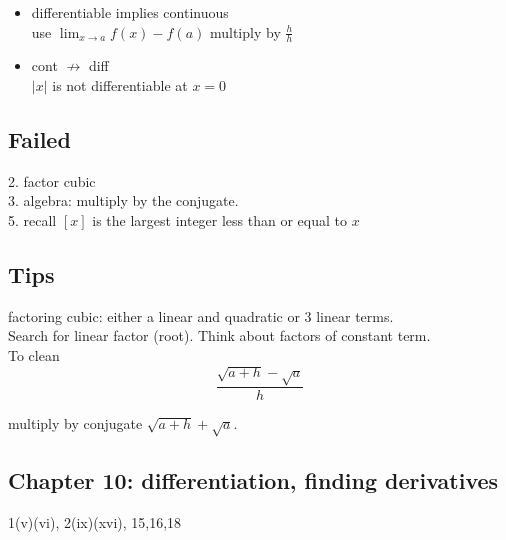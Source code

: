 \documentclass[a4paper, 12pt]{article}
\begin{document}

\begin{itemize}
    \item differentiable implies continuous\\
   \textcolor[gray]{0.5}{ use $\lim_{x\rightarrow a} f(x) - f(a)$ multiply by $\frac{h}{h}$}
    \item cont $\not \rightarrow$ diff\\ 
    $|x|$ is not differentiable at $x=0$
\end{itemize}

\subsection*{Failed}
2. factor cubic\\
3. algebra: multiply by the conjugate.\\
5. recall $[x]$ is the largest integer less than or equal to $x$
\subsection*{Tips}

factoring cubic: either a linear and quadratic or 3 linear terms. \\
Search for linear factor (root). Think about factors of constant term. \\

To clean $$\frac{\sqrt{a + h} - \sqrt{a}}{h}$$

multiply by conjugate $\sqrt{a + h} + \sqrt{a}$.






\subsection*{Chapter 10: differentiation, finding derivatives}
1(v)(vi), 2(ix)(xvi), 15,16,18\\
\medskip
\end{document}
